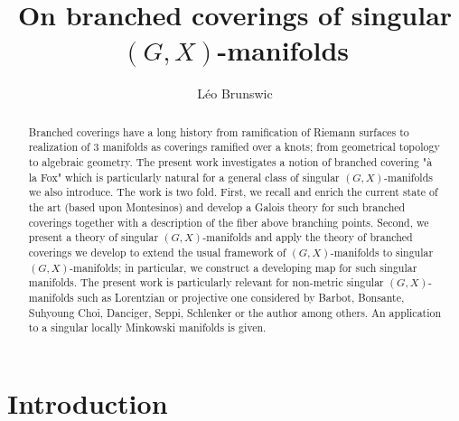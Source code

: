 \documentclass[a4paper,12pt]{article}
\title{On branched coverings of singular $(G,X)$-manifolds}
\author{L\'eo Brunswic}
\begin{document}
\maketitle
\begin{abstract}    %
Branched coverings have a long history from ramification of Riemann surfaces to realization of 3 manifolds as coverings ramified over a knots; from geometrical topology to algebraic geometry. 
The present work investigates a notion of branched covering "à la Fox" which is particularly natural for a general class of singular $(G,X)$-manifolds we also introduce.
The work is two fold. First, we recall and enrich the current state of the art (based upon Montesinos) and develop a Galois theory for such branched coverings together with a description  of the fiber above branching points. 
Second, we present a theory of singular $(G,X)$-manifolds and apply the theory of branched coverings we develop to extend the usual framework of $(G,X)$-manifolds to singular $(G,X)$-manifolds; in particular, we construct a developing map for such singular manifolds.  The present work  is particularly relevant for non-metric singular $(G,X)$-manifolds such as Lorentzian or projective one considered by Barbot, Bonsante, Suhyoung Choi, Danciger, Seppi, Schlenker or the author among others.
An application to a singular locally Minkowski manifolds is given.
\end{abstract}

\tableofcontents

        \section{Introduction}
\end{document}

